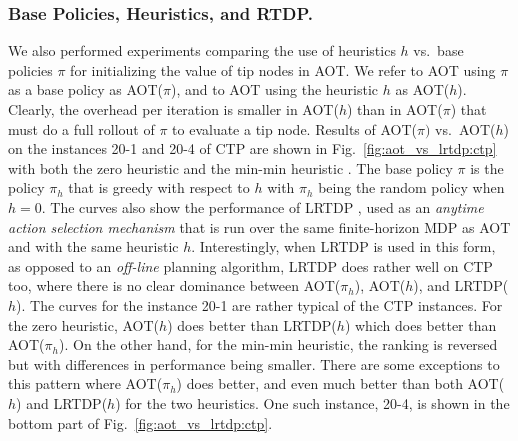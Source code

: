 \documentclass[letterpaper]{article}
\newcommand{\Omit}[1]{}
\begin{document}
\Omit{
and found that while the $\Delta$
It
based on the computation of the $\Delta$'s, and
the use of base policies vs.\ heuristic values for
setting the values of tips in AOT.
In principle, $\Delta$-based selection
of tip nodes payoffs a lot in comparison with random tip
selection, when a base random policy is used, and less when informed
base policies are used instead  (Fig.~\ref{fig:ctp:selection:10-7}).
}




\subsubsection{Base Policies,  Heuristics, and RTDP.}
We also performed experiments comparing the use of heuristics $h$
vs.\ base policies $\pi$ for initializing the value of tip nodes in
AOT. We  refer to AOT using $\pi$ as a base policy as AOT($\pi$),
and to  AOT using the heuristic $h$ as AOT($h$).
Clearly, the overhead per iteration is smaller in AOT($h$) than in AOT($\pi$)
that must do a full rollout of $\pi$ to evaluate a tip node.
Results of AOT($\pi)$ vs.\ AOT($h$) on the instances 20-1 and 20-4 of CTP are shown
in Fig.~\ref{fig:aot_vs_lrtdp:ctp} with both the zero heuristic and the min-min heuristic
\cite{bonet:lrtdp}. The base policy $\pi$  is the policy $\pi_h$
that is greedy with respect to $h$ with $\pi_h$ being the random policy when $h=0$.
The curves also show the performance of LRTDP \cite{bonet:lrtdp},  used as an
\emph{anytime action selection mechanism} that is run over the same finite-horizon MDP as AOT
and with the same heuristic $h$. Interestingly, when LRTDP is used in this form,
as opposed to an \emph{off-line} planning algorithm, LRTDP does rather well on CTP too,
where there is no clear dominance  between AOT($\pi_h$), AOT($h$), and LRTDP($h$).
The curves for the instance 20-1 are rather typical of the CTP instances.
For the zero heuristic, AOT($h$) does  better  than LRTDP($h$) which does better
 than AOT($\pi_h$). On the other hand, for the min-min heuristic, the ranking
 is  reversed but with differences in performance being smaller.
There are  some exceptions to this pattern where AOT($\pi_h$) does
better, and even much better than  both  AOT($h$) and LRTDP($h$) for the two heuristics.
One such instance, 20-4, is shown in the bottom part of  Fig.~\ref{fig:aot_vs_lrtdp:ctp}.
\end{document}
